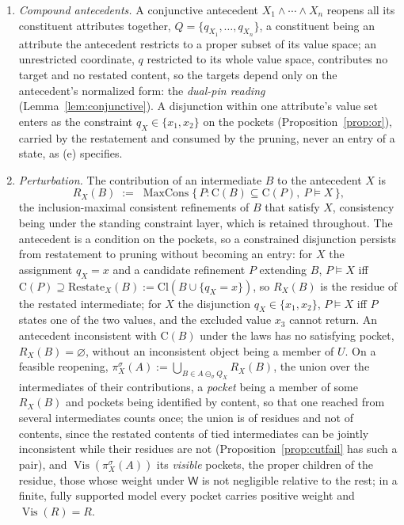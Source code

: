 \begin{definition}
\begin{enumerate}
\item[(d)] \emph{Compound antecedents.} A conjunctive antecedent $X_1 \wedge \cdots \wedge X_n$ reopens all its constituent attributes together, $Q = \{q_{X_1}, \dots, q_{X_n}\}$, a constituent being an attribute the antecedent restricts to a proper subset of its value space; an unrestricted coordinate, $q$ restricted to its whole value space, contributes no target and no restated content, so the targets depend only on the antecedent's normalized form: the \emph{dual-pin reading} (Lemma~\ref{lem:conjunctive}). A disjunction within one attribute's value set enters as the constraint $q_X \in \{x_1, x_2\}$ on the pockets (Proposition~\ref{prop:or}), carried by the restatement and consumed by the pruning, never an entry of a state, as (e) specifies.
\item[(e)] \emph{Perturbation.} The contribution of an intermediate $B$ to the antecedent $X$ is
\[
R_X(B) \;:=\; \operatorname{MaxCons}\{\,P : \mathrm{C}(B) \subseteq \mathrm{C}(P),\ P \models X\,\},
\]
the inclusion-maximal consistent refinements of $B$ that satisfy $X$, consistency being under the standing constraint layer, which is retained throughout. The antecedent is a condition on the pockets, so a constrained disjunction persists from restatement to pruning without becoming an entry: for $X$ the assignment $q_X = x$ and a candidate refinement $P$ extending $B$, $P \models X$ iff $\mathrm{C}(P) \supseteq \mathrm{Restate}_X(B) := \mathrm{Cl}(B \cup \{q_X = x\})$, so $R_X(B)$ is the residue of the restated intermediate; for $X$ the disjunction $q_X \in \{x_1, x_2\}$, $P \models X$ iff $P$ states one of the two values, and the excluded value $x_3$ cannot return. An antecedent inconsistent with $\mathrm{C}(B)$ under the laws has no satisfying pocket, $R_X(B) = \varnothing$, without an inconsistent object being a member of $U$. On a feasible reopening, $\pi^\sigma_X(A) := \bigcup_{B \in A \ominus_\sigma Q_X} R_X(B)$, the union over the intermediates of their contributions, a \emph{pocket} being a member of some $R_X(B)$ and pockets being identified by content, so that one reached from several intermediates counts once; the union is of residues and not of contents, since the restated contents of tied intermediates can be jointly inconsistent while their residues are not (Proposition~\ref{prop:cutfail} has such a pair), and $\operatorname{Vis}(\pi^\sigma_X(A))$ its \emph{visible} pockets, the proper children of the residue, those whose weight under $\mathsf{W}$ is not negligible relative to the rest; in a finite, fully supported model every pocket carries positive weight and $\operatorname{Vis}(R) = R$.

\end{enumerate}
\end{definition}

